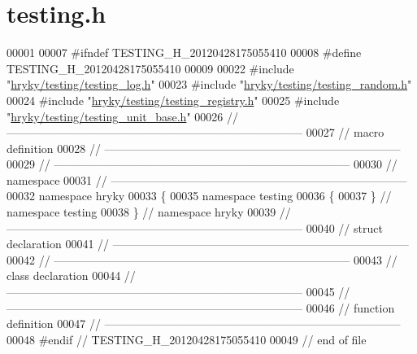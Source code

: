 \hypertarget{testing_8h_source}{\section{testing.\-h}
}

\begin{DoxyCode}
00001 
00007 \textcolor{preprocessor}{#ifndef TESTING\_H\_20120428175055410}
00008 \textcolor{preprocessor}{}\textcolor{preprocessor}{#define TESTING\_H\_20120428175055410}
00009 \textcolor{preprocessor}{}
00022 \textcolor{preprocessor}{#include "\hyperlink{testing__log_8h}{hryky/testing/testing_log.h}"}
00023 \textcolor{preprocessor}{#include "\hyperlink{testing__random_8h}{hryky/testing/testing_random.h}"}
00024 \textcolor{preprocessor}{#include "\hyperlink{testing__registry_8h}{hryky/testing/testing_registry.h}"}
00025 \textcolor{preprocessor}{#include "\hyperlink{testing__unit__base_8h}{hryky/testing/testing_unit_base.h}"}
00026 \textcolor{comment}{//
      ------------------------------------------------------------------------------}
00027 \textcolor{comment}{// macro definition}
00028 \textcolor{comment}{//
      ------------------------------------------------------------------------------}
00029 \textcolor{comment}{//
      ------------------------------------------------------------------------------}
00030 \textcolor{comment}{// namespace}
00031 \textcolor{comment}{//
      ------------------------------------------------------------------------------}
00032 \textcolor{keyword}{namespace }hryky
00033 \{
00035 \textcolor{keyword}{namespace }testing
00036 \{
00037 \} \textcolor{comment}{// namespace testing}
00038 \} \textcolor{comment}{// namespace hryky}
00039 \textcolor{comment}{//
      ------------------------------------------------------------------------------}
00040 \textcolor{comment}{// struct declaration}
00041 \textcolor{comment}{//
      ------------------------------------------------------------------------------}
00042 \textcolor{comment}{//
      ------------------------------------------------------------------------------}
00043 \textcolor{comment}{// class declaration}
00044 \textcolor{comment}{//
      ------------------------------------------------------------------------------}
00045 \textcolor{comment}{//
      ------------------------------------------------------------------------------}
00046 \textcolor{comment}{// function definition}
00047 \textcolor{comment}{//
      ------------------------------------------------------------------------------}
00048 \textcolor{preprocessor}{#endif // TESTING\_H\_20120428175055410}
00049 \textcolor{preprocessor}{}\textcolor{comment}{// end of file}
\end{DoxyCode}
